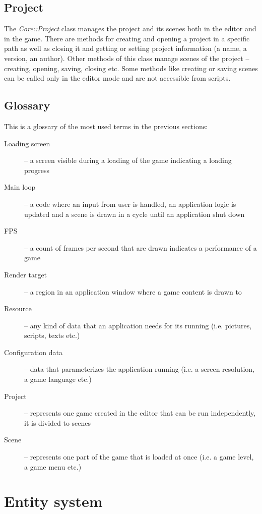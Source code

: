 \documentclass[a4paper, 12pt]{report}
\begin{document}
\section{Project}

The \emph{Core::Project} class manages the project and its scenes both in the editor and in the game. There are methods for creating and opening a project in a specific path as well as closing it and getting or setting project information (a name, a version, an author). Other methods of this class manage scenes of the project -- creating, opening, saving, closing etc. Some methods like creating or saving scenes can be called only in the editor mode and are not accessible from scripts.

\section{Glossary}
This is a glossary of the most used terms in the previous sections:

\begin{description}
  \item[Loading screen] -- a screen visible during a loading of the game indicating a loading progress
  \item[Main loop] -- a code where an input from user is handled, an application logic is updated and a scene is drawn in a cycle until an application shut down
  \item[FPS] -- a count of frames per second that are drawn indicates a performance of a game
  \item[Render target] -- a region in an application window where a game content is drawn to
  \item[Resource] -- any kind of data that an application needs for its running (i.e. pictures, scripts, texts etc.)
  \item[Configuration data] -- data that parameterizes the application running (i.e. a screen resolution, a game language etc.)
  \item[Project] -- represents one game created in the editor that can be run independently, it is divided to scenes
  \item[Scene] -- represents one part of the game that is loaded at once (i.e. a game level, a game menu etc.)
\end{description}


\chapter{Entity system}
\end{document}
